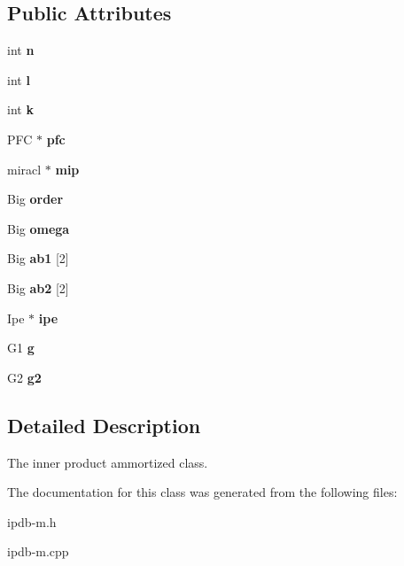 \subsection*{Public Attributes}
\begin{DoxyCompactItemize}
\item 
int {\bfseries n}\hypertarget{classIpdb_a8359e860242c394a701b39e50e61dc52}{}\label{classIpdb_a8359e860242c394a701b39e50e61dc52}

\item 
int {\bfseries l}\hypertarget{classIpdb_ac188ad7b6f7bb9d590501d633a546552}{}\label{classIpdb_ac188ad7b6f7bb9d590501d633a546552}

\item 
int {\bfseries k}\hypertarget{classIpdb_abd041d0cb75530f5f5619348899d6117}{}\label{classIpdb_abd041d0cb75530f5f5619348899d6117}

\item 
P\+FC $\ast$ {\bfseries pfc}\hypertarget{classIpdb_af1311e917bef9cf02a8f2e13ae2f872d}{}\label{classIpdb_af1311e917bef9cf02a8f2e13ae2f872d}

\item 
miracl $\ast$ {\bfseries mip}\hypertarget{classIpdb_a1c882734071e75895cc886d3045b9dbb}{}\label{classIpdb_a1c882734071e75895cc886d3045b9dbb}

\item 
Big {\bfseries order}\hypertarget{classIpdb_a6af3d4046ab1e46b61005fd8273e8276}{}\label{classIpdb_a6af3d4046ab1e46b61005fd8273e8276}

\item 
Big {\bfseries omega}\hypertarget{classIpdb_a77d39c78f7fc859e11c434261fa5398b}{}\label{classIpdb_a77d39c78f7fc859e11c434261fa5398b}

\item 
Big {\bfseries ab1} \mbox{[}2\mbox{]}\hypertarget{classIpdb_a749f1da0f3061da1f2979ea163700a7b}{}\label{classIpdb_a749f1da0f3061da1f2979ea163700a7b}

\item 
Big {\bfseries ab2} \mbox{[}2\mbox{]}\hypertarget{classIpdb_ac652d64e8a525c6ff42d92c764d18c30}{}\label{classIpdb_ac652d64e8a525c6ff42d92c764d18c30}

\item 
Ipe $\ast$ {\bfseries ipe}\hypertarget{classIpdb_a29e7eee08acde4fd33de519b27def09c}{}\label{classIpdb_a29e7eee08acde4fd33de519b27def09c}

\item 
G1 {\bfseries g}\hypertarget{classIpdb_aef14479818fde911d8c71be2333f72f5}{}\label{classIpdb_aef14479818fde911d8c71be2333f72f5}

\item 
G2 {\bfseries g2}\hypertarget{classIpdb_a9ccba97ad1c9c35d93ab4f94a2c8f5c8}{}\label{classIpdb_a9ccba97ad1c9c35d93ab4f94a2c8f5c8}

\end{DoxyCompactItemize}


\subsection{Detailed Description}
The inner product ammortized class. 

The documentation for this class was generated from the following files\+:\begin{DoxyCompactItemize}
\item 
ipdb-\/m.\+h\item 
ipdb-\/m.\+cpp\end{DoxyCompactItemize}

